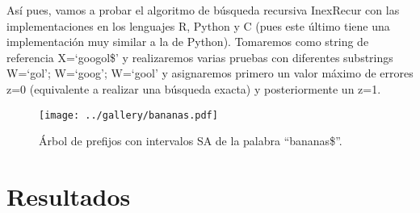 \documentclass{article}
\begin{document}
Así pues, vamos a probar el algoritmo de búsqueda recursiva  InexRecur
con las implementaciones en los lenguajes R, Python  y	C  (pues  este
último	tiene  una  implementación  muy  similar  a  la  de   Python).
Tomaremos como string de referencia X=`googol\$’ y realizaremos	varias
pruebas  con  diferentes  substrings  W=`gol’;	W=`goog’;  W=`gool’  y
asignaremos primero un valor máximo  de  errores  z=0  (equivalente  a
realizar   una	 búsqueda   exacta)   y   posteriormente    un	  z=1.


\phantom{}
\begin{figure}[h!]
\centering
\texttt{[image: ../gallery/bananas.pdf]}
\caption{Árbol de prefijos con intervalos SA de la palabra ``bananas\$''.}
\label{fig:arbol3}
\end{figure}

\section{Resultados}
\end{document}
